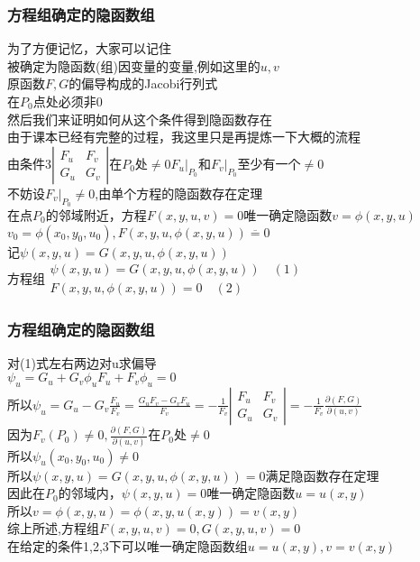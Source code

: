 \documentclass[xetex]{beamer}
\begin{document}
\begin{frame}
\frametitle{方程组确定的隐函数组}
	为了方便记忆，大家可以记住\\
	被确定为隐函数(组)因变量的变量,例如这里的$u,v$\\
	原函数$F,G$的偏导构成的Jacobi行列式\\
	在$P_0$点处必须非0 \\ \pause
	然后我们来证明如何从这个条件得到隐函数存在\\
	由于课本已经有完整的过程，我这里只是再提炼一下大概的流程\\
	由条件3\quad$\left|\begin{matrix}
		F_u&F_v\\
		G_u&G_v
	\end{matrix}\right|$在$P_0$处$\not =0$\quad $F_u|_{P_0}$和$F_v|_{P_0}$至少有一个$\not =0$\\ \pause
	不妨设$F_v|_{P_0}\not =0$,由单个方程的隐函数存在定理\\
	在点$P_0$的邻域附近，方程$F(x,y,u,v)=0$唯一确定隐函数$v=\phi(x,y,u)$\\ \pause
	$v_0=\phi(x_0,y_0,u_0),F(x,y,u,\phi(x,y,u))\overline{=}0$\\
	记$\psi(x,y,u)=G(x,y,u,\phi(x,y,u))$\\
	方程组$
	\begin{matrix}
		\psi(x,y,u)=G(x,y,u,\phi(x,y,u))\quad (1)\\
		F(x,y,u,\phi(x,y,u))=0	\quad (2)
	\end{matrix}
	$
\end{frame}

\begin{frame}
\frametitle{方程组确定的隐函数组}
	对(1)式左右两边对u求偏导\\
	$\psi_u=G_u+G_v\phi_u$\quad $F_u+F_v\phi_u=0$ \\ \pause
	所以$\psi_u=G_u-G_v\frac{F_u}{F_v}=\frac{G_uF_v-G_vF_u}{F_v}=-\frac{1}{F_v}\left|\begin{matrix}
		F_u&F_v\\
		G_u&G_v
	\end{matrix}\right|=-\frac{1}{F_v}\frac{\partial (F,G)}{\partial (u,v)}$\\ \pause
	因为$F_v(P_0)\not=0,\frac{\partial (F,G)}{\partial (u,v)}$在$P_0$处$\not=0$\\
	所以$\psi_u(x_0,y_0,u_0)\not=0$\\ \pause
	所以$\psi(x,y,u)=G(x,y,u,\phi(x,y,u))=0$满足隐函数存在定理\\
	因此在$P_0$的邻域内，$\psi(x,y,u)=0$唯一确定隐函数$u=u(x,y)$\\
	所以$v=\phi(x,y,u)=\phi(x,y,u(x,y))=v(x,y)$\\
	综上所述,方程组$F(x,y,u,v)=0,G(x,y,u,v)=0$\\
	在给定的条件1,2,3下\quad 可以唯一确定隐函数组$u=u(x,y),v=v(x,y)$\\
	
	
\end{frame}
\end{document}
